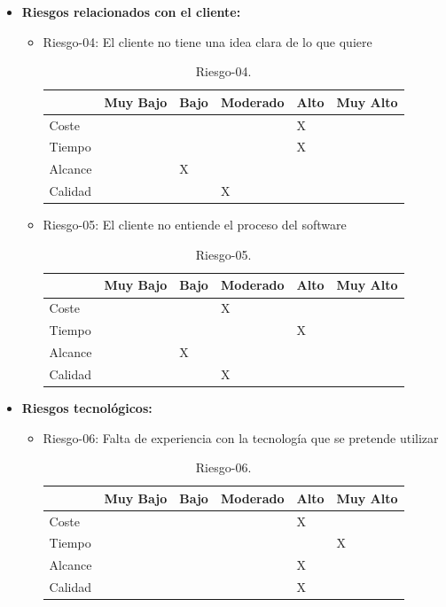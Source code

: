 \begin{itemize}[-]
\item \textbf{Riesgos relacionados con el cliente:}
\begin{itemize}[-]
\item Riesgo-04: El cliente no tiene una idea clara de lo que quiere
\begin{table}[H]
\begin{center}
\begin{tabular}{ l l l l l l }
\hline
	 & Muy Bajo & Bajo & Moderado & Alto & Muy Alto \\ \hline \hline
	Coste &  &  &  & X &  \\ \hline
	Tiempo &  &  &  & X &  \\ \hline
	Alcance &  & X &  &  &  \\ \hline
	Calidad &  &  & X &  &  \\ \hline
\end{tabular}
\caption{Riesgo-04.}
\label{Riesgo-04}
\end{center}
\end{table}

\item Riesgo-05: El cliente no entiende el proceso del software
\begin{table}[H]
\begin{center}
\begin{tabular}{ l l l l l l }
\hline
	 & Muy Bajo & Bajo & Moderado & Alto & Muy Alto \\ \hline \hline
	Coste &  &  & X &  &  \\ \hline
	Tiempo &  &  &  & X &  \\ \hline
	Alcance &  & X &  &  &  \\ \hline
	Calidad &  &  & X &  &  \\ \hline
\end{tabular}
\caption{Riesgo-05.}
\label{Riesgo-05}
\end{center}
\end{table}
\end{itemize}

\item \textbf{Riesgos tecnológicos:}
\begin{itemize}[-]
\item Riesgo-06: Falta de experiencia con la tecnología que se pretende utilizar
\begin{table}[H]
\begin{center}
\begin{tabular}{ l l l l l l }
\hline
	 & Muy Bajo & Bajo & Moderado & Alto & Muy Alto \\ \hline \hline
	Coste &  &  &  & X &  \\ \hline
	Tiempo &  &  &  &  & X \\ \hline
	Alcance &  &  &  & X &  \\ \hline
	Calidad &  &  &  & X &  \\ \hline
\end{tabular}
\caption{Riesgo-06.}
\label{Riesgo-06}
\end{center}
\end{table}
\end{itemize}


\end{itemize}
